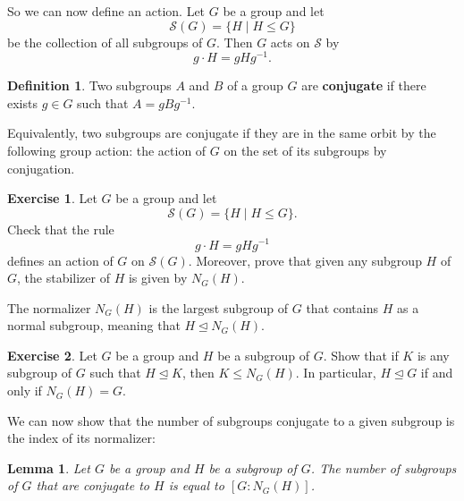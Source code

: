 \documentclass[12pt]{report}
\newtheorem{lemma}[theorem]{Lemma}
\numberwithin{equation}{section}
\numberwithin{theorem}{chapter}
\theoremstyle{definition}
\newtheorem{definition}[theorem]{Definition}
\newtheorem{exercise}{Exercise}
\newtheorem*{basic properties}{Basic Properties}
\newtheorem*{Important Remark}{Important Remark}
\newcommand{\cS}{\mathcal{S}}
\def\norm{\mathrel{\unlhd}}
\begin{document}
So we can now define an action.
Let $G$ be a group and let
$$\mathcal{S}(G) = \{H \mid H \leq G \}$$ 
be the collection of all subgroups of $G$. Then $G$ acts on $\mathcal{S}$ by 
$$g \cdot H = gHg^{-1}.$$


\begin{definition}
	Two subgroups $A$ and $B$ of a group $G$ are {\bf conjugate} if there exists $g \in G$ such that $A = gBg^{-1}$.
\end{definition}


Equivalently, two subgroups are conjugate if they are in the same orbit by the following group action: the action of $G$ on the set of its subgroups by conjugation.

\begin{exercise}\label{stabilizer of H by conjugation is N(G)}
Let $G$ be a group and let
$$\mathcal{S}(G) = \{H \mid H \leq G \}.$$ 
	Check that the rule
	$$g \cdot H = gHg^{-1}$$
	defines an action of $G$ on $\mathcal{S}(G)$. Moreover, prove that given any subgroup $H$ of $G$, the stabilizer of $H$ is given by $N_G(H)$.
\end{exercise}


The normalizer $N_G(H)$ is the largest subgroup of $G$ that contains $H$ as a normal subgroup, meaning that $H \norm N_G(H)$. 


\begin{exercise}
	Let $G$ be a group and $H$ be a subgroup of $G$. Show that if $K$ is any subgroup of $G$ such that $H \norm K$, then $K \leq N_G(H)$. In particular, $H \norm G$ if and only if $N_G(H) = G$.
\end{exercise}

We can now show that the number of subgroups conjugate to a given subgroup is the index of its normalizer:

\begin{lemma}\label{number of conjugates of H is index of the normalizer}
Let $G$ be a group and $H$ be a subgroup of $G$. The number of subgroups of $G$ that are conjugate to $H$ is equal to $[G: N_G(H)]$.
\end{lemma}
\end{document}
